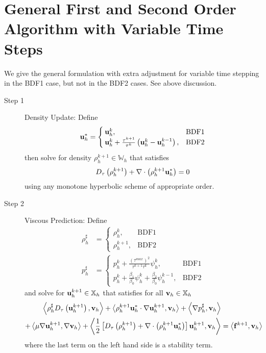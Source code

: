 \documentclass[letterpaper]{erdc}
\begin{document}
%
%
%
\section{General First and Second Order Algorithm with Variable Time Steps}\label{sec:GeneralAlgorithm}
We give the general formulation with extra adjustment for variable time stepping in the BDF1 case, but not in the BDF2 cases.  See above discussion.

\begin{description}
\item[Step 1] Density Update: Define
\begin{equation}
  \textbf{u}_h^{*} = \begin{cases}
                \textbf{u}_h^{k}, & \mbox{BDF1} \\
                \textbf{u}_h^{k} + \frac{\tau^{k+1}}{\tau^k}\left( \textbf{u}_h^{k} - \textbf{u}_h^{k-1}\right), & \mbox{BDF2} 
               \end{cases}
 \end{equation}
then solve for density $\rho_h^{k+1}\in \mathbb{W}_h$ that satisfies
\begin{equation}\label{eqn:generaldensity}
D_{\tau}\left(\rho_h^{k+1}\right) + \nabla\cdot\left( \rho_h^{k+1}\textbf{u}_h^{*} \right) = 0
\end{equation}
using any monotone hyperbolic scheme of appropriate order. 

\item[Step 2] Viscous Prediction: Define
\begin{align}
  \rho_h^{\sharp} &= \begin{cases}
                       \rho_h^{k}, & \mbox{BDF1} \\
                       \rho_h^{k+1}, & \mbox{BDF2} 
                      \end{cases}\\
  p_h^{\sharp} &= \begin{cases}
                  p_h^{k} + \frac{\left(\tau^{max}\right)^2}{\tau^{k+1}\tau^{k}}\psi_h^{k}, & \mbox{BDF1}\\ 
                  p_h^{k} + \frac{\beta_1}{\beta_0}\psi_h^{k} + \frac{\beta_2}{\beta_0}\psi_h^{k-1}, & \mbox{BDF2} 
                 \end{cases}
\end{align}
and solve for $\textbf{u}_h^{k+1}\in\mathbb{X}_h$ that satisfies for all $\textbf{v}_h\in\mathbb{X}_h$
\begin{equation}\label{eqn:generalvelocity}
  \begin{split}
    \left\langle \rho_h^{\sharp}D_{\tau}\left(\textbf{u}_h^{k+1}\right), \textbf{v}_h \right\rangle  + \left\langle \rho_h^{k+1}\textbf{u}_h^{*}\cdot\nabla\textbf{u}_h^{k+1}, \textbf{v}_h \right\rangle +\left\langle \nabla p_h^{\sharp}, \textbf{v}_h \right\rangle &\\
     + \left\langle \mu\nabla\textbf{u}_h^{k+1}, \nabla\textbf{v}_h \right\rangle  + \left\langle \frac{1}{2}\left[ D_{\tau}\left(\rho_h^{k+1}\right) + \nabla\cdot\left( \rho_h^{k+1}\textbf{u}_h^{*} \right)\right] \textbf{u}_h^{k+1}, \textbf{v}_h \right\rangle &= \left\langle \mathbf{f}^{k+1}, \textbf{v}_h \right\rangle
  \end{split}
\end{equation}
where the last term on the left hand side is a stability term.  


\end{description}
\end{document}
